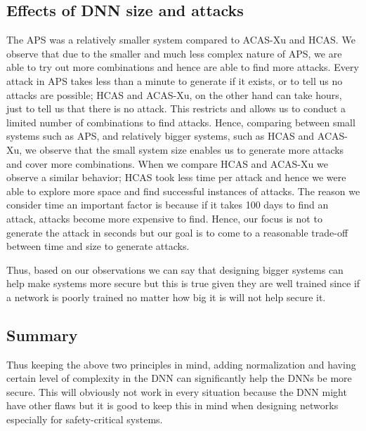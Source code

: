 \subsection{Effects of DNN size and attacks}
The \ac{APS} was a relatively smaller system compared to \ac{ACAS-Xu} and \ac{HCAS}.
We observe that due to the smaller and much less complex nature of \ac{APS}, we are able to try out more combinations and hence are able to find more attacks. 
Every attack in \ac{APS} takes less than a minute to generate if it exists, or to tell us no attacks are possible; 
\ac{HCAS} and \ac{ACAS-Xu}, on the other hand can take hours, just to tell us that there is no attack.  
This restricts and allows us to conduct a limited number of combinations to find attacks. 
Hence, comparing between small systems such as \ac{APS}, and relatively bigger systems, such as \ac{HCAS} and \ac{ACAS-Xu}, we observe that the small system size enables us to generate more attacks and cover more combinations. 
When we compare \ac{HCAS} and \ac{ACAS-Xu} we observe a similar behavior; \ac{HCAS} took less time per attack and hence we were able to explore more space and find successful instances of attacks. 
The reason we consider time an important factor is because if it takes 100 days to find an attack, attacks become more expensive to find. 
Hence, our focus is not to generate the attack in seconds but our goal is to come to a reasonable trade-off between time and size to generate attacks. 

Thus, based on our observations we can say that designing bigger systems can help make systems more secure but this is true given they are well trained since if a network is poorly trained no matter how big it is will not help secure it. 




\subsection{Summary}
Thus keeping the above two principles in mind, adding normalization and having certain level of complexity in the \ac{DNN} can significantly help the \ac{DNN}s be more secure.  
This will obviously not work in every situation because the \ac{DNN} might have other flaws but it is good to keep this in mind when designing networks especially for safety-critical systems. 

